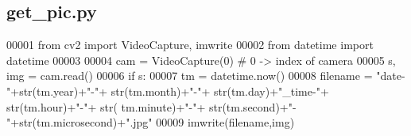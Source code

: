\subsection{get\+\_\+pic.\+py}
\label{get__pic_8py_source}

\begin{DoxyCode}
00001 \textcolor{keyword}{from} cv2 \textcolor{keyword}{import} VideoCapture, imwrite
00002 \textcolor{keyword}{from} datetime \textcolor{keyword}{import} datetime
00003 
00004 cam = VideoCapture(0) \textcolor{comment}{# 0 -> index of camera}
00005 s, img = cam.read()
00006 \textcolor{keywordflow}{if} s:
00007     tm = datetime.now()
00008     filename = \textcolor{stringliteral}{"date-"}+str(tm.year)+\textcolor{stringliteral}{"-"}+ str(tm.month)+\textcolor{stringliteral}{"-"}+ str(tm.day)+\textcolor{stringliteral}{"\_time-"}+ str(tm.hour)+\textcolor{stringliteral}{"-"}+ str(
      tm.minute)+\textcolor{stringliteral}{"-"}+ str(tm.second)+\textcolor{stringliteral}{"-"}+str(tm.microsecond)+\textcolor{stringliteral}{".jpg"}
00009     imwrite(filename,img)
\end{DoxyCode}

